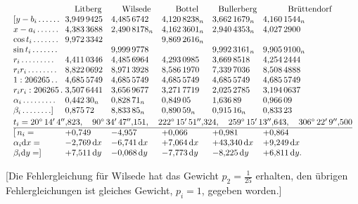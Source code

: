 \[
\resizebox{\linewidth}{!}{\(\begin{array}{@{}l@{\;}l@{\quad}l@{\quad}l@{\quad}l@{\quad}l@{}}
 &\multicolumn{1}{c}{\text{Litberg}}
 &\multicolumn{1}{c}{\text{Wilsede}}
 &\multicolumn{1}{c}{\text{Bottel}}
 &\multicolumn{1}{c}{\text{Bullerberg}}
 &\multicolumn{1}{c@{}}{\text{Brüttendorf}}\\
 {[}y-b_i\,.\,.\,.\,.\,.\,.&3{,}949\,9425&4{,}485\,6742&4{,}120\,8238_{n}&3{,}662\,1679_{n}&4{,}160\,1544_{n}\\
 x-a_i\,.\,.\,.\,.\,.\,.&4{,}383\,3688&2{,}490\,8178_{n}&4{,}162\,3601_{n}&2{,}940\,4353_{n}&4{,}027\,2900\\
 \cos t_i\,.\,.\,.\,.\,.\,.\,.&9{,}972\,3342&&9{,}869\,2616_{n}&&\\
 \sin t_i\,.\,.\,.\,.\,.\,.\,.&&9{,}999\,9778&&9{,}992\,3161_{n}&9{,}905\,9100_{n}\\
 r_i\,.\,.\,.\,.\,.\,.\,.\,.\,.&4{,}411\,0346&4{,}485\,6964&4{,}293\,0985&3{,}669\,8518&4{,}254\,2444\\
 r_ir_i\,.\,.\,.\,.\,.\,.\,.\,.&8{,}822\,0692&8{,}971\,3928&8{,}586\,1970&7{,}339\,7036&8{,}508\,4888\\
 1:206265\,.\,.&4{,}685\,5749&4{,}685\,5749&4{,}685\,5749&4{,}685\,5749&4{,}685\,5749\\
 r_ir_i:206265\,.&3{,}507\,6441&3{,}656\,9677&3{,}271\,7719&2{,}025\,2785&3{,}194\,0637\\
 \alpha_i\,.\,.\,.\,.\,.\,.\,.\,.\,.&0{,}442\,30_{n}&0{,}828\,71_{n}&0{,}849\,05&1{,}636\,89&0{,}966\,09\\
 \beta_i\,.\,.\,.\,.\,.\,.\,.\,.]&0{,}875\,72&8{,}833\,85_{n}&0{,}890\,59_{n}&0{,}915\,16_{n}&0{,}833\,23
\\[2pt]
 \multicolumn{6}{@{}l@{}}{t_i=20^\circ\,14'\,4''{,}823,\quad
 90^\circ\,34'\,47''{,}151,\quad222^\circ\,15'\,51''{,}324,\quad
 259^\circ\,15'\,13''{,}643,\quad306^\circ\,22'\,9''{,}500}\\
 \hline
 [\,n_i=&+0{,}749&-4{,}957&+0{,}066&+0{,}981&+0{,}864\\
 \alpha_i\mathrm{d}x=&-2{,}769\,\mathrm{d}x&-6{,}741\,\mathrm{d}x&+7{,}064\,\mathrm{d}x&+43{,}340\,\mathrm{d}x&+9{,}249\,\mathrm{d}x\\
 \beta_i\mathrm{d}y=]&+7{,}511\,\mathrm{d}y&-0{,}068\,\mathrm{d}y&-7{,}773\,\mathrm{d}y&-8{,}225\,\mathrm{d}y&+6{,}811\,\mathrm{d}y.
\end{array}\)}
\]

[Die Fehlergleichung für Wilsede hat das Gewicht \(p_2=\tfrac1{25}\) erhalten, den übrigen Fehlergleichungen ist gleiches Gewicht, \(p_i=1\), gegeben worden.]

